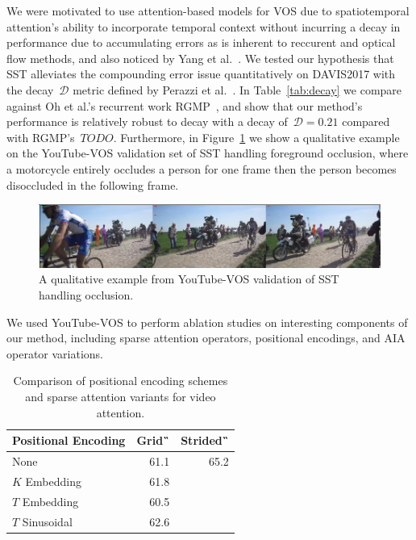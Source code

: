 We were motivated to use attention-based models for VOS due to spatiotemporal
attention's ability to incorporate temporal context without incurring a decay
in performance due to accumulating errors as is inherent to reccurent and
optical flow methods, and also noticed by Yang et al.~\cite{yang2019anchor}.
We tested our hypothesis that SST alleviates the compounding error issue
quantitatively on DAVIS2017 with the decay~$\mathcal{D}$ metric defined by
Perazzi et al.~\cite{perazzi2016abenchmark}.
In Table~\ref{tab:decay} we compare against Oh et al.'s recurrent work
RGMP~\cite{oh2018fast}, and show that our method's performance is relatively
robust to decay with a decay of~$\mathcal{D} = 0.21$ compared with
RGMP's~$TODO$.
Furthermore, in Figure~\ref{fig:ainaocclusion} we show a qualitative example on
the YouTube-VOS validation set of SST handling foreground occlusion, where a
motorcycle entirely occludes a person for one frame then the person becomes
disoccluded in the following frame.

\begin{figure}
\centering
\includegraphics[scale=0.26]{Figures/aina-occlusion}
\caption{A qualitative example from YouTube-VOS validation of SST handling
         occlusion.}
\label{fig:ainaocclusion}
\end{figure}

We used YouTube-VOS to perform ablation studies on interesting components of
our method, including sparse attention operators, positional encodings, and AIA
operator variations.

\begin{table}
\caption{Comparison of positional encoding schemes and sparse attention
         variants for video attention.}
\centering
\begin{tabular}{lrr}
\toprule
Positional Encoding & Grid~\G{} & Strided~\G{} \\
\midrule
None & \num{61.1} & 65.2 \\
$K$ Embedding & \num{61.8} & \\
$T$ Embedding & \num{60.5} & \\
$T$ Sinusoidal & \num{62.6} & \\
\bottomrule
\end{tabular}
\label{tab:pos-encoding}
\end{table}

